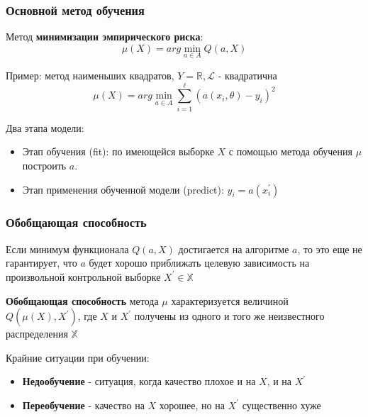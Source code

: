 \documentclass{beamer}
\begin{document}
		
	\begin{frame}
		\frametitle{Основной метод обучения}
		Метод \textbf{минимизации эмпирического риска}:
		$$
		\mu(X) = arg \min_{a \in A} Q(a, X)
		$$
		
		Пример: метод наименьших квадратов, $Y = \mathbb{R}, \mathcal{L}$ - квадратична
		$$
		\mu(X) = arg \min_{a \in A} \sum_{i=1}^{\ell} (a(x_i, \theta) - y_i)^{2}
		$$
		
		\vspace{5pt}
		
		Два этапа модели:
		\begin{itemize}
			\item Этап обучения (fit): по имеющейся выборке $X$ с помощью метода обучения $\mu$ построить $a$.
		
			\item Этап применения обученной модели (predict): $\hat{y}_i = a(x_i^{'})$
		\end{itemize}
	\end{frame}
		
	\begin{frame}
		\frametitle{Обобщающая способность}
		Если минимум функционала $Q(a, X)$ достигается на алгоритме $a$, то это еще не гарантирует, что $a$ будет хорошо приближать целевую зависимость на произвольной контрольной выборке $X^{'} \in \mathbb{X}$
		
		\vspace{15pt}
		
		\textbf{Обобщающая способность} метода $\mu$ характеризуется величиной $Q(\mu(X), X^{'})$, где $X$ и $X^{'}$ получены из одного и того же неизвестного распределения $\mathbb{X}$
		
		\vspace{15pt}
		
		Крайние ситуации при обучении:
		\begin{itemize}		
			\item \textbf{Недообучение} - ситуация, когда качество плохое и на $X$, и на $X^{'}$
			\item \textbf{Переобучение} - качество на $X$ хорошее, но на $X^{'}$ существенно хуже
		\end{itemize}
		
	\end{frame}
\end{document}
